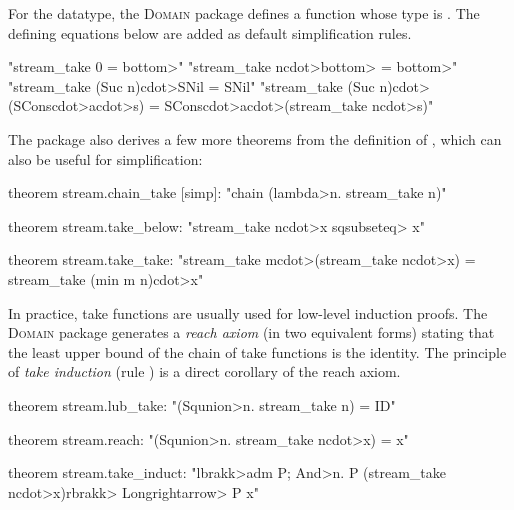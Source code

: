 For the  datatype, the \textsc{Domain} package defines a function  whose type is . The defining equations below are added as default simplification rules.
%
\begin{isacode}
  "stream_take 0 = \<bottom>"
  "stream_take n\<cdot>\<bottom> = \<bottom>"
  "stream_take (Suc n)\<cdot>SNil = SNil"
  "stream_take (Suc n)\<cdot>(SCons\<cdot>a\<cdot>s) = SCons\<cdot>a\<cdot>(stream_take n\<cdot>s)"
\end{isacode}
%
The package also derives a few more theorems from the definition of , which can also be useful for simplification:
%
\begin{isacode}
theorem stream.chain_take [simp]: "chain (\<lambda>n. stream_take n)"
\end{isacode}
\unmedskip
{}
\begin{isacode}
theorem stream.take_below: "stream_take n\<cdot>x \<sqsubseteq> x"
\end{isacode}
\unmedskip
{}
\begin{isacode}
theorem stream.take_take:
  "stream_take m\<cdot>(stream_take n\<cdot>x) = stream_take (min m n)\<cdot>x"
\end{isacode}

In practice, take functions are usually used for low-level induction proofs. The \textsc{Domain} package generates a \emph{reach axiom} (in two equivalent forms) stating that the least upper bound of the chain of take functions is the identity. The principle of \emph{take induction} (rule ) is a direct corollary of the reach axiom.

\begin{isacode}
theorem stream.lub_take: "(\<Squnion>n. stream_take n) = ID"
\end{isacode}
\unmedskip
{}
\begin{isacode}
theorem stream.reach: "(\<Squnion>n. stream_take n\<cdot>x) = x"
\end{isacode}
\unmedskip
{}
\begin{isacode}
theorem stream.take_induct: "\<lbrakk>adm P; \<And>n. P (stream_take n\<cdot>x)\<rbrakk> \<Longrightarrow> P x"
\end{isacode}

